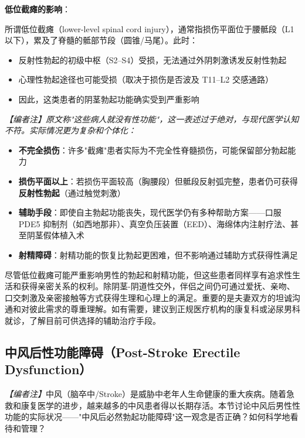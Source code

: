 \vspace{0.5em}
\noindent\textbf{低位截瘫的影响}：

所谓低位截瘫（lower-level spinal cord injury），通常指损伤平面位于腰骶段（L1以下），累及了脊髓的骶部节段（圆锥/马尾）。此时：
\begin{itemize}
	\item 反射性勃起的初级中枢（S2--S4）受损，无法通过外阴刺激诱发反射性勃起
	\item 心理性勃起途径也可能受损（取决于损伤是否波及 T11--L2 交感通路）
	\item 因此，这类患者的阴茎勃起功能确实受到严重影响
\end{itemize}

\noindent\textit{【编者注】原文称"这些病人就没有性功能"，这一表述过于绝对，与现代医学认知不符。实际情况更为复杂和个体化：}

\begin{itemize}
	\item \textbf{不完全损伤}：许多"截瘫"患者实际为不完全性脊髓损伤，可能保留部分勃起能力
	\item \textbf{损伤平面以上}：若损伤平面较高（胸腰段）但骶段反射弧完整，患者仍可获得\textbf{反射性勃起}（通过触觉刺激）
	\item \textbf{辅助手段}：即使自主勃起功能丧失，现代医学仍有多种帮助方案——口服 PDE5 抑制剂（如西地那非）、真空负压装置（EED）、海绵体内注射疗法、甚至阴茎假体植入术
	\item \textbf{射精障碍}：射精功能的恢复比勃起更困难，但不影响通过辅助方式获得性满足
\end{itemize}

\begin{tcolorbox}[colback=pink!5!white,colframe=red!50!black,title=贴心小叮咛]
尽管低位截瘫可能严重影响男性的勃起和射精功能，但这些患者同样享有追求性生活和获得亲密关系的权利。除阴茎-阴道性交外，伴侣之间仍可通过爱抚、亲吻、口交刺激及亲密接触等方式获得生理和心理上的满足。重要的是夫妻双方的坦诚沟通和对彼此需求的尊重理解。如有需要，建议到正规医疗机构的康复科或泌尿男科就诊，了解目前可供选择的辅助治疗手段。
\end{tcolorbox}

\subsection{中风后性功能障碍（Post-Stroke Erectile Dysfunction）}

\noindent\textit{【编者注】}中风（脑卒中/Stroke）是威胁中老年人生命健康的重大疾病。随着急救和康复医学的进步，越来越多的中风患者得以长期存活。本节讨论中风后男性性功能的实际状况——"中风后必然勃起功能障碍"这一观念是否正确？如何科学地看待和管理？


